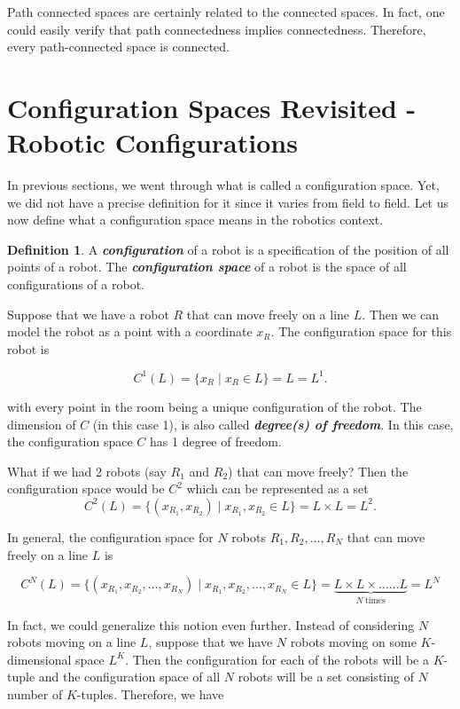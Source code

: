 \documentclass{article}
\theoremstyle{definition}
\newtheorem*{definition}{Definition}
\begin{document}
Path connected spaces are certainly related to the connected spaces.
In fact, one could easily verify that path connectedness implies connectedness.
Therefore, every path-connected space is connected.


\section*{\centering Configuration Spaces Revisited - Robotic Configurations}
In previous sections, we went through what is called a configuration space.
Yet, we did not have a precise definition for it since it varies from field to field.
Let us now define what a configuration space means in the robotics context.

\begin{definition}
\cite{10} A \textit{\textbf{configuration}} of a robot is a specification of the position of all points of a robot.
The \textit{\textbf{configuration space}} of a robot is the space of all configurations of a robot.
\end{definition}

Suppose that we have a robot $R$ that can move freely on a line $L$. Then we can model the robot as
a point with a coordinate $x_R$. The configuration space for this robot is

$$C^1(L) = \{x_R \mid x_R \in L\} = L = L^1.$$

with every point in the room being a unique configuration of the robot.
The dimension of $C$ (in this case 1), is also called \textit{\textbf{degree(s) of freedom}}.
In this case, the configuration space $C$ has 1 degree of freedom.

\bigskip

What if we had 2 robots (say $R_1$ and $R_2$) that can move freely?
Then the configuration space would be $C^2$ which can be represented as a set
$$C^2(L) = \{(x_{R_1}, x_{R_2}) \mid x_{R_1}, x_{R_2} \in L\} = L \times L = L^2.$$

In general, the configuration space for $N$ robots $R_1, R_2, \dots, R_N$ that can move freely on a line $L$ is

$$C^N(L) = \{(x_{R_1}, x_{R_2}, \dots, x_{R_N}) \mid x_{R_1}, x_{R_2}, \dots, x_{R_N} \in L\} = \underbrace{L \times L \times \dots \dots L}_{N \ \text{times}} = L^N$$

In fact, we could generalize this notion even further. Instead of considering
$N$ robots moving on a line $L$, suppose that we have $N$ robots moving on some
$K$-dimensional space $L^K$. Then the configuration for each of the robots will
be a $K$-tuple and the configuration space of all $N$ robots will be a set consisting
of $N$ number of $K$-tuples. Therefore, we have
\end{document}
